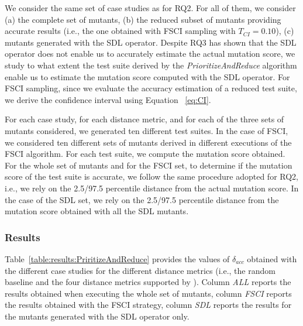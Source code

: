 We consider the same set of case studies as for RQ2.
For all of them, we consider (a) the complete set of mutants, (b) the reduced subset of mutants providing accurate results (i.e., the one obtained with FSCI sampling with $T_{\mathit{CI}}=0.10$), (c) mutants generated with the SDL operator. 
{Despite RQ3 has shown that the SDL operator does not enable us to accurately estimate the actual mutation score, we study to what extent the test suite derived by the \emph{PrioritizeAndReduce} algorithm enable us to estimate the mutation score computed with the SDL operator.}
For FSCI sampling, since we evaluate the accuracy estimation of a reduced test suite, we derive the confidence interval using Equation ~\ref{eq:CI}.


For each case study, for each distance metric, and for each of the three sets of mutants considered, we generated ten different \APPR test suites. In the case of FSCI, we considered ten different sets of mutants derived in different executions of the FSCI algorithm. For each \APPR test suite, we compute the mutation score obtained. For the whole set of mutants and for the FSCI set, to determine if the mutation score of the \APPR test suite is accurate, we follow the same procedure adopted for RQ2, i.e., we rely on the 2.5/97.5 percentile distance from the actual mutation score. In the case of the SDL set, we rely on the 2.5/97.5 percentile distance from the mutation score obtained with all the SDL mutants.


\subsubsection*{Results}



Table~\ref{table:results:PriritizeAndReduce} provides the values of $\delta_{acc}$ obtained with the different case studies for the different distance metrics (i.e., the random baseline and the four distance metrics supported by \APPR). Column \emph{ALL} reports the results obtained when executing the whole set of mutants, column \emph{FSCI}  reports the results obtained  with the FSCI strategy, column \emph{SDL} reports the results for the mutants generated with the SDL operator only.

